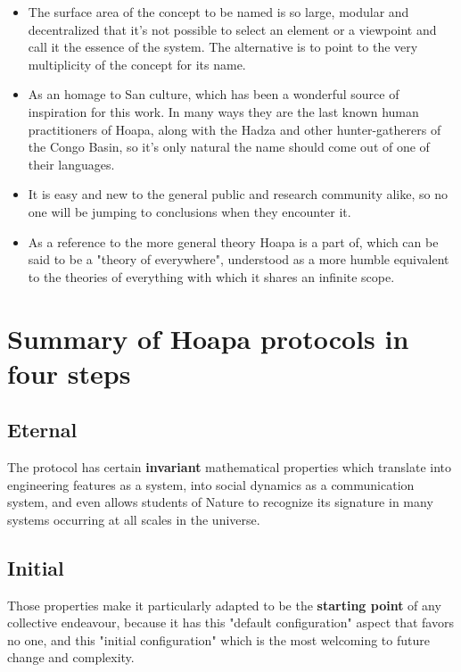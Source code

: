 \documentclass[11pt]{article}
\begin{document}
\begin{itemize}

\item The surface area of the concept to be named is so large, modular and decentralized that it's not possible to select an element or a viewpoint and call it the essence of the system. The alternative is to point to the very multiplicity of the concept for its name.

\item As an homage to San culture, which has been a wonderful source of inspiration for this work. In many ways they are the last known human practitioners of Hoapa, along with the Hadza and other hunter-gatherers of the Congo Basin, so it's only natural the name should come out of one of their languages.

\item It is easy and new to the general public and research community alike, so no one will be jumping to conclusions when they encounter it.

\item As a reference to the more general theory Hoapa is a part of, which can be said to be a "theory of everywhere", understood as a more humble equivalent to the theories of everything with which it shares an infinite scope.

\end{itemize}

\section{Summary of Hoapa protocols in four steps}

\subsection{Eternal}

The protocol has certain \textbf{invariant} mathematical properties which translate into engineering features as a system, into social dynamics as a communication system, and even allows students of Nature to recognize its signature in many systems occurring at all scales in the universe.

\subsection{Initial}

Those properties make it particularly adapted to be the \textbf{starting point} of any collective endeavour, because it has this "default configuration" aspect that favors no one, and this "initial configuration" which is the most welcoming to future change and complexity.
\end{document}
